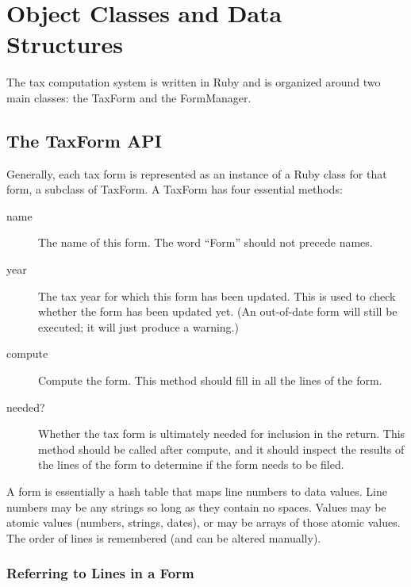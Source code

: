 \section{Object Classes and Data Structures}

The tax computation system is written in Ruby and is organized around two main
classes: the TaxForm and the FormManager.


\subsection{The TaxForm API}

Generally, each tax form is represented as an instance of a Ruby class for that
form, a subclass of TaxForm. A TaxForm has four essential methods:
\begin{description}
\item[name] The name of this form. The word ``Form'' should not precede names.
\item[year] The tax year for which this form has been updated. This is used to
check whether the form has been updated yet. (An out-of-date form will still
be executed; it will just produce a warning.)
\item[compute] Compute the form. This method should fill in all the lines of the
form.
\item[needed?] Whether the tax form is ultimately needed for inclusion in the
return. This method should be called after compute, and it should inspect the
results of the lines of the form to determine if the form needs to be filed.
\end{description}

A form is essentially a hash table that maps line numbers to data values. Line
numbers may be any strings so long as they contain no spaces. Values may be
atomic values (numbers, strings, dates), or may be arrays of those atomic
values. The order of lines is remembered (and can be altered manually).


\subsubsection{Referring to Lines in a Form}

